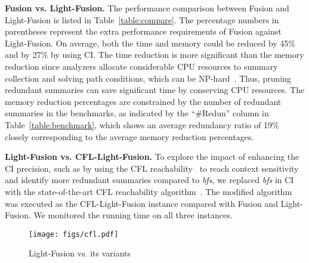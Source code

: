 \textbf{Fusion vs. Light-Fusion.}
The performance comparison between Fusion and Light-Fusion is listed in Table~\ref{table:compare}.
The percentage numbers in parentheses represent the extra performance requirements of Fusion against Light-Fusion.
On average, both the time and memory could be reduced by 45\% and by 27\% by using CI.
The time reduction is more significant than the memory reduction since analyzers allocate considerable CPU resources to summary collection and solving path conditions, which can be NP-hard~\cite{fan2019smoke, cook2023complexity}. 
Thus, pruning redundant summaries can save significant time by conserving CPU resources.
The memory reduction percentages are constrained by the number of redundant summaries in the benchmarks, as indicated by the ``\#Redun'' column in Table~\ref{table:benchmark}, which shows an average redundancy ratio of 19\% closely corresponding to the average memory reduction percentages.




\textbf{Light-Fusion vs. CFL-Light-Fusion.}
To explore the impact of enhancing the CI precision, such as by using the CFL reachability~\cite{kodumal2004set, chaudhuri2008subcubic, yannakakis1990graph, melski2000interconvertibility} to reach context sensitivity and identify more redundant summaries compared to \textit{bfs}, we replaced \textit{bfs} in CI with the state-of-the-art CFL reachability algorithm~\cite{lei2022taming}. 
The modified algorithm was executed as the CFL-Light-Fusion instance compared with Fusion and Light-Fusion.
We monitored the running time on all three instances.



\begin{figure}[t]
    \centering
    \texttt{[image: figs/cfl.pdf]}
    \caption{Light-Fusion vs. its variants}
    \label{fig:cfl-light-fusion}
    \vspace{-0.2cm}
\end{figure}


